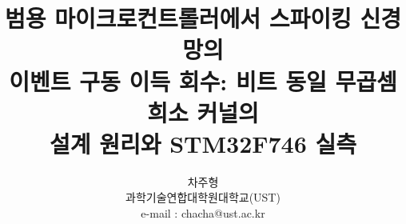 \documentclass[preprint]{IEIE} %
\title{범용 마이크로컨트롤러에서 스파이킹 신경망의\\이벤트 구동 이득 회수: 비트 동일 무곱셈 희소 커널의\\설계 원리와 STM32F746 실측}
\author{차주형 \\ 과학기술연합대학원대학교(UST) \\ e-mail : chacha@ust.ac.kr}
\begin{document}
\maketitle
\makeabstract
















{\footnotesize

}
\end{document}
